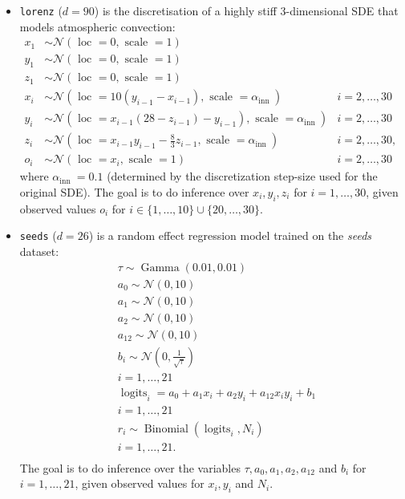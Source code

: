\begin{itemize}
\item  \texttt{lorenz} ($d=90$)  is the discretisation of a highly stiff 3-dimensional SDE that models atmospheric convection:
$$
\begin{array}{rlrl}
x_1 & \sim \mathcal{N}(\text { loc }=0, \text { scale }=1) & \\
y_1 & \sim \mathcal{N}(\text { loc }=0, \text { scale }=1) & \\
z_1 & \sim \mathcal{N}(\text { loc }=0, \text { scale }=1) & & \\
x_i & \sim \mathcal{N}\left(\text { loc }=10\left(y_{i-1}-x_{i-1}\right), \text { scale }=\alpha_{\text {inn }}\right) & i=2, \ldots, 30 \\
y_i & \left.\sim \mathcal{N}\left(\text { loc }=x_{i-1}\left(28-z_{i-1}\right)-y_{i-1}\right), \text { scale }=\alpha_{\text {inn }}\right) & i=2, \ldots, 30 \\
z_i & \sim \mathcal{N}\left(\text { loc }=x_{i-1} y_{i-1}-\frac{8}{3} z_{i-1}, \text { scale }=\alpha_{\text {inn }}\right) & i=2, \ldots, 30, \\
o_i & \sim \mathcal{N}\left(\text { loc }=x_i, \text { scale }=1\right) & i=2, \ldots, 30
\end{array}
$$
where $\alpha_{\text {inn }}=0.1$ (determined by the discretization step-size used for the original SDE). The goal is to do inference over $x_i, y_i, z_i$ for $i=1, \ldots, 30$, given observed values $o_i$ for $i \in\{1, \ldots, 10\} \cup\{20, \ldots, 30\}$.

\item \texttt{seeds} ($d=26$) is a random effect regression model trained on the \textit{seeds} dataset:
\begin{align*}
& \tau \sim \operatorname{Gamma}(0.01,0.01) \\
& a_0 \sim \mathcal{N}(0,10) \\
& a_1 \sim \mathcal{N}(0,10) \\
& a_2 \sim \mathcal{N}(0,10) \\
& a_{12} \sim \mathcal{N}(0,10) \\
& b_i \sim \mathcal{N}\left(0, \frac{1}{\sqrt{\tau}}\right) \\
& i=1, \ldots, 21 \\
& \operatorname{logits}_i=a_0+a_1 x_i+a_2 y_i+a_{12} x_i y_i+b_1 \\
& i=1, \ldots, 21 \\
& r_i \sim \operatorname{Binomial}\left(\operatorname{logits}_i, N_i\right) \\
& i=1, \ldots, 21 \text {. } \\
&
\end{align*}
The goal is to do inference over the variables $\tau, a_0, a_1, a_2, a_{12}$ and $b_i$ for $i=1, \ldots, 21$, given observed values for $x_i, y_i$ and $N_i$.
\end{itemize}

